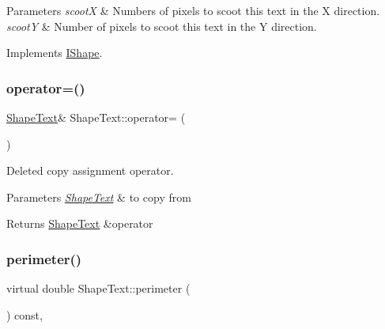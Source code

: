 \begin{DoxyParams}{Parameters}
{\em scootX} & Numbers of pixels to scoot this text in the X direction. \\
\hline
{\em scootY} & Number of pixels to scoot this text in the Y direction. \\
\hline
\end{DoxyParams}


Implements \mbox{\hyperlink{class_i_shape_a3d23494cd34e658cc6b39a2e2db0b7fe}{I\+Shape}}.

\mbox{\label{class_shape_text_a420d8e795e693a4e9f087786152f931a}} 
\subsubsection{\texorpdfstring{operator=()}{operator=()}}
{\footnotesize\ttfamily \mbox{\hyperlink{class_shape_text}{Shape\+Text}}\& Shape\+Text\+::operator= (\begin{DoxyParamCaption}\item[{const \mbox{\hyperlink{class_shape_text}{Shape\+Text}} \&}]{ }\end{DoxyParamCaption})\hspace{0.3cm}{\ttfamily [delete]}}



Deleted copy assignment operator. 


\begin{DoxyParams}{Parameters}
{\em \mbox{\hyperlink{class_shape_text}{Shape\+Text}}} & to copy from \\
\hline
\end{DoxyParams}
\begin{DoxyReturn}{Returns}
\mbox{\hyperlink{class_shape_text}{Shape\+Text}} \&operator 
\end{DoxyReturn}
\mbox{\label{class_shape_text_a76550783952e8dc25f187cd4996ebf2b}} 
\subsubsection{\texorpdfstring{perimeter()}{perimeter()}}
{\footnotesize\ttfamily virtual double Shape\+Text\+::perimeter (\begin{DoxyParamCaption}{ }\end{DoxyParamCaption}) const\hspace{0.3cm}{\ttfamily [inline]}, {\ttfamily [virtual]}}



